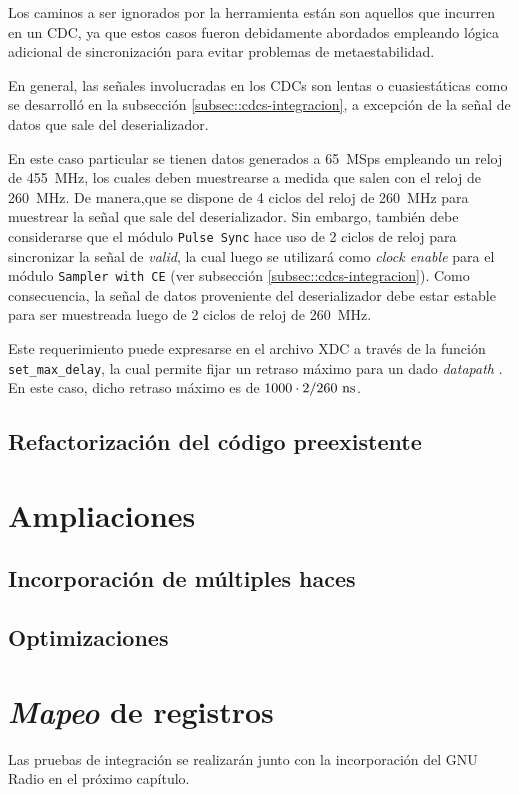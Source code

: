 \documentclass[../../main.tex]{subfiles}
\begin{document}
Los caminos a ser ignorados por la herramienta están son aquellos que incurren en un CDC, ya que estos casos fueron debidamente abordados empleando lógica adicional de sincronización para evitar problemas de metaestabilidad. 

En general, las señales involucradas en los CDCs son lentas o cuasiestáticas como se desarrolló en la subsección \ref{subsec::cdcs-integracion}, a excepción de la señal de datos que sale del deserializador. 

En este caso particular se tienen datos generados a 65~MSps empleando un reloj de 455~MHz, los cuales deben muestrearse a medida que salen con el reloj de 260~MHz. De manera,que se dispone de 4 ciclos del reloj de 260~MHz para muestrear la señal que sale del deserializador. Sin embargo, también debe considerarse que el módulo \texttt{Pulse Sync} hace uso de 2 ciclos de reloj para sincronizar la señal de \textit{valid}, la cual luego se utilizará como \textit{clock enable} para el módulo \texttt{Sampler with CE} (ver subsección \ref{subsec::cdcs-integracion}). Como consecuencia, la señal de datos proveniente del deserializador debe estar estable para ser muestreada luego de 2 ciclos de reloj de 260~MHz.

Este requerimiento puede expresarse en el archivo XDC a través de la función \texttt{set\_max\_delay}, la cual permite fijar un retraso máximo para un dado \textit{datapath} \cite{set-max-delay}. En este caso, dicho retraso máximo es de $1000 \cdot 2/260~\textrm{ns}$.
\subsection{Refactorización del código preexistente}
\section{Ampliaciones}
\subsection{Incorporación de múltiples haces}
\subsection{Optimizaciones}

\section{\textit{Mapeo} de registros}

Las pruebas de integración se realizarán junto con la incorporación del GNU Radio en el próximo capítulo.
\end{document}
